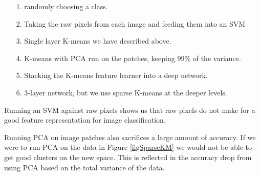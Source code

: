\documentclass{article}
\begin{document}
\begin{itemize}
\item[1.] randomly choosing a class.
\item[2.] Taking the raw pixels from each image and feeding them into an SVM
\item[3.] Single layer K-means we have described above.
\item[4.] K-means with PCA run on the patches, keeping 99\% of the variance.
\item[5.] Stacking the K-means feature learner into a deep network.
\item[6.] 3-layer network, but we use sparse K-means at the deeper levels.
\end{itemize}
Running an SVM against raw pixels shows us that raw pixels do not make for a good feature representation for image classification.

Running PCA on image patches also sacrifices a large amount of accuracy. If we were to run PCA on the data in Figure \ref{figSparseKM} we would not be able to get good clusters on the new space. This is reflected in the accuracy drop from using PCA based on the total variance of the data.
\end{document}
